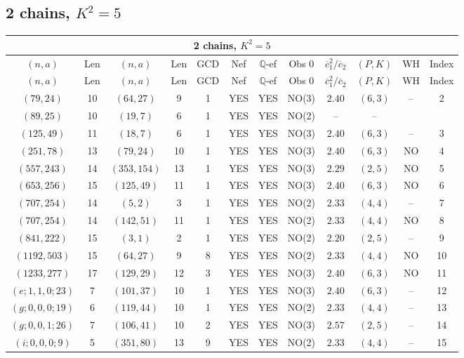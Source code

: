\subsection{2 chains, $K^2 = 5$}
\begin{longtable}{|c|c|c|c|c|c|c|c|c|c|c|c|}
\hline
\multicolumn{12}{|c|}{2 chains, $K^2 = 5$}\\
\hline
$(n,a)$ & Len & $(n,a)$ & Len & GCD & Nef & $\mathbb Q$-ef & Obs 0 & $\overline c_1^2 / \overline c_2$ & $(P,K)$ & WH & Index\\
\hline
\endfirsthead

\hline
$(n,a)$ & Len & $(n,a)$ & Len & GCD & Nef & $\mathbb Q$-ef & Obs 0 & $\overline c_1^2 / \overline c_2$ & $(P,K)$ & WH & Index\\
\hline
\endhead
\hline
\endfoot

$(79,24)$ & 10 & $(64,27)$ & 9 & 1 & YES & YES & NO(3) & $2.40$ & $(6,3)$ & -- & 2\\
$(89,25)$ & 10 & $(19,7)$ & 6 & 1 & YES & YES & NO(2) & -- & -- & \\
$(125,49)$ & 11 & $(18,7)$ & 6 & 1 & YES & YES & NO(3) & $2.40$ & $(6,3)$ & -- & 3\\
$(251,78)$ & 13 & $(79,24)$ & 10 & 1 & YES & YES & NO(3) & $2.40$ & $(6,3)$ & NO & 4\\
$(557,243)$ & 14 & $(353,154)$ & 13 & 1 & YES & YES & NO(3) & $2.29$ & $(2,5)$ & NO & 5\\
$(653,256)$ & 15 & $(125,49)$ & 11 & 1 & YES & YES & NO(3) & $2.40$ & $(6,3)$ & NO & 6\\
$(707,254)$ & 14 & $(5,2)$ & 3 & 1 & YES & YES & NO(2) & $2.33$ & $(4,4)$ & -- & 7\\
$(707,254)$ & 14 & $(142,51)$ & 11 & 1 & YES & YES & NO(2) & $2.33$ & $(4,4)$ & NO & 8\\
$(841,222)$ & 15 & $(3,1)$ & 2 & 1 & YES & YES & NO(2) & $2.20$ & $(2,5)$ & -- & 9\\
$(1192,503)$ & 15 & $(64,27)$ & 9 & 8 & YES & YES & NO(2) & $2.33$ & $(4,4)$ & NO & 10\\
$(1233,277)$ & 17 & $(129,29)$ & 12 & 3 & YES & YES & NO(3) & $2.40$ & $(6,3)$ & NO & 11\\
$(e;1,1,0;23)$ & 7 & $(101,37)$ & 10 & 1 & YES & YES & NO(3) & $2.40$ & $(6,3)$ & -- & 12\\
$(g;0,0,0;19)$ & 6 & $(119,44)$ & 10 & 1 & YES & YES & NO(2) & $2.33$ & $(4,4)$ & -- & 13\\
$(g;0,0,1;26)$ & 7 & $(106,41)$ & 10 & 2 & YES & YES & NO(3) & $2.57$ & $(2,5)$ & -- & 14\\
$(i;0,0,0;9)$ & 5 & $(351,80)$ & 13 & 9 & YES & YES & NO(2) & $2.33$ & $(4,4)$ & -- & 15
\end{longtable}
